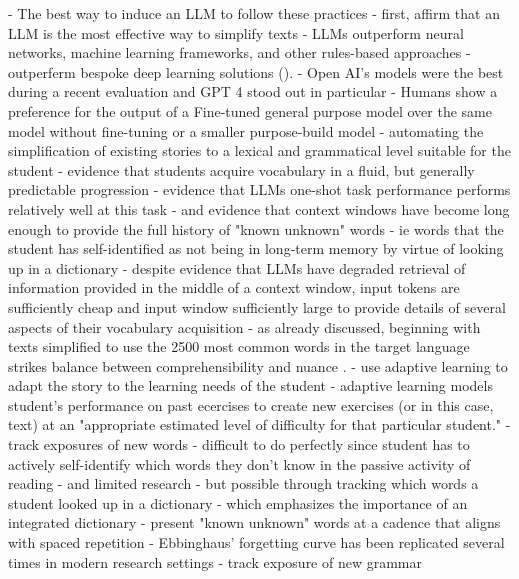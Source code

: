\documentclass[
	letterpaper, %
]{jdf}
\begin{document}
- The best way to induce an LLM to follow these practices
  - first, affirm that an LLM is the most effective way to simplify texts
    - LLMs outperform neural networks, machine learning frameworks, and other rules-based approaches
      - outperferm bespoke deep learning solutions (\cite{feng2023sentence}).
    - Open AI's models were the best during a recent evaluation \cite{kew2023bless} and GPT 4 stood out in particular \cite{wu2024indepth}
    - Humans show a preference for the output of a Fine-tuned general purpose model over the same model without fine-tuning or a smaller purpose-build model \cite{ai_human_taking_turns_creating_story}
  - automating the simplification of existing stories to a lexical and grammatical level suitable for the student
    - evidence that students acquire vocabulary in a fluid, but generally predictable progression
    - evidence that LLMs one-shot task performance performs relatively well at this task
      - and evidence that context windows have become long enough to provide the full history of "known unknown" words
        - ie words that the student has self-identified as not being in long-term memory by virtue of looking up in a dictionary
        - despite evidence that LLMs have degraded retrieval of information provided in the middle of a context window, input tokens are sufficiently cheap and input window sufficiently large to provide details of several aspects of their vocabulary acquisition \cite{liu2023lost}
    - as already discussed, beginning with texts simplified to use the 2500 most common words in the target language strikes balance between comprehensibility and nuance \cite{nation1992vocabulary}.
  - use adaptive learning to adapt the story to the learning needs of the student 
    - adaptive learning models student's performance on past ecercises to create new exercises (or in this case, text) at an "appropriate estimated level of difficulty for that particular student." \cite{important_adaptive_learning_exercise_generation}
    - track exposures of new words 
      - difficult to do perfectly since student has to actively self-identify which words they don't know in the passive activity of reading
        - and limited research
        - but possible through tracking which words a student looked up in a dictionary
          - which emphasizes the importance of an integrated dictionary
    - present "known unknown" words at a cadence that aligns with spaced repetition
      - Ebbinghaus' forgetting curve has been replicated several times in modern research settings \cite{Murre2015ReplicationAA}
    - track exposure of new grammar
\end{document}

